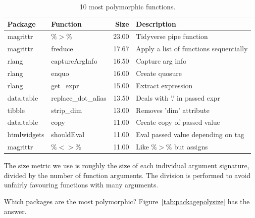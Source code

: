 \documentclass[acmsmall,10pt,review,anonymous]{acmart}\settopmatter{printfolios=true,printccs=false,printacmref=false}
\begin{document}
\begin{table}[ht]
\label{tab:bigpolyfuns}
\centering
\begin{tabular}{llrl}
  \hline
Package & Function & Size & Description \\
  \hline
magrittr & \%$>$\% & 23.00 & Tidyverse pipe function \\
  magrittr & freduce & 17.67 & Apply a list of functions sequentially \\
  rlang & captureArgInfo & 16.50 & Capture arg info \\
  rlang & enquo & 16.00 & Create quosure \\
  rlang & get\_expr & 15.00 & Extract expression \\
  data.table & replace\_dot\_alias & 13.50 & Deals with '.' in passed expr \\
  tibble & strip\_dim & 13.00 & Removes 'dim' attribute \\
  data.table & copy & 11.00 & Create copy of passed value \\
  htmlwidgets & shouldEval & 11.00 & Eval passed value depending on tag \\
  magrittr & \%$<$$>$\% & 11.00 & Like \%$>$\% but assigns \\
   \hline
\end{tabular}
\caption{10 most polymorphic functions.}
\end{table}

The size metric we use is roughly the size of each individual argument signature, divided by the number of function arguments.
The division is performed to avoid unfairly favouring functions with many arguments.

Which packages are the most polymorphic?
Figure~\ref{tab:packagepolysize} has the answer.
\end{document}
